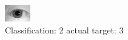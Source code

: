 \begin{figure}[h!]
\begin{center}
\includegraphics[width=0.60\columnwidth]{figures/ID1092_class_2_target_3.png}
\end{center}
\caption{ Classification: 2 actual target: 3}
\label{fig:ID1092_class_2_target_3}
\end{figure}
